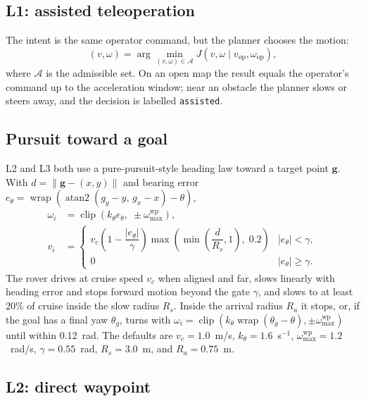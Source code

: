 \subsection{L1: assisted teleoperation}

The intent is the same operator command, but the planner chooses the motion:
\begin{equation}
  (v, \omega) = \arg\min_{(v,\omega) \in \mathcal{A}} J(v, \omega \mid v_{\text{op}}, \omega_{\text{op}}),
\end{equation}
where $\mathcal{A}$ is the admissible set.
On an open map the result equals the operator's command up to the acceleration window; near an obstacle the planner slows or steers away, and the decision is labelled \texttt{assisted}.

\subsection{Pursuit toward a goal}

L2 and L3 both use a pure-pursuit-style heading law toward a target point $\mathbf{g}$.
With $d = \lVert \mathbf{g} - (x, y) \rVert$ and bearing error $e_\theta = \operatorname{wrap}(\operatorname{atan2}(g_y - y,\, g_x - x) - \theta)$,
\begin{align}
  \omega_i &= \operatorname{clip}(k_\theta e_\theta,\; \pm\omega_{\max}^{\text{wp}}), \\
  v_i &= \begin{cases} v_c \left(1 - \dfrac{|e_\theta|}{\gamma}\right) \max\!\left(\min\!\left(\dfrac{d}{R_s}, 1\right),\; 0.2\right) & |e_\theta| < \gamma, \\ 0 & |e_\theta| \ge \gamma. \end{cases}
  \label{eq:pursuit}
\end{align}
The rover drives at cruise speed $v_c$ when aligned and far, slows linearly with heading error and stops forward motion beyond the gate $\gamma$, and slows to at least 20\% of cruise inside the slow radius $R_s$.
Inside the arrival radius $R_a$ it stops, or, if the goal has a final yaw $\theta_g$, turns with $\omega_i = \operatorname{clip}(k_\theta \operatorname{wrap}(\theta_g - \theta), \pm\omega_{\max}^{\text{wp}})$ until within 0.12~rad.
The defaults are $v_c = 1.0$~m/s, $k_\theta = 1.6$~s$^{-1}$, $\omega_{\max}^{\text{wp}} = 1.2$~rad/s, $\gamma = 0.55$~rad, $R_s = 3.0$~m, and $R_a = 0.75$~m.

\subsection{L2: direct waypoint}

